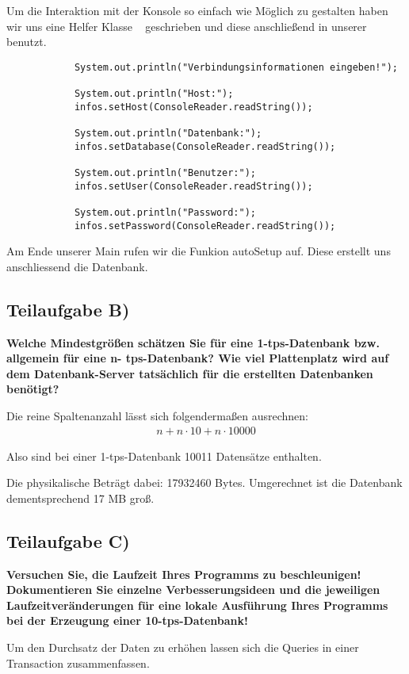 Um die Interaktion mit der Konsole so einfach wie Möglich zu gestalten haben wir
uns eine Helfer Klasse ~ geschrieben und diese anschließend
in unserer  benutzt.

\begin{lstlisting}
			System.out.println("Verbindungsinformationen eingeben!");
			
			System.out.println("Host:");
			infos.setHost(ConsoleReader.readString());

			System.out.println("Datenbank:");
			infos.setDatabase(ConsoleReader.readString());
			
			System.out.println("Benutzer:");
			infos.setUser(ConsoleReader.readString());
			
			System.out.println("Password:");
			infos.setPassword(ConsoleReader.readString());
\end{lstlisting}

Am Ende unserer Main rufen wir die Funkion autoSetup auf. Diese erstellt uns
anschliessend die Datenbank.

\subsection{Teilaufgabe B)}
\textbf{Welche Mindestgrößen schätzen Sie für eine 1-tps-Datenbank bzw. allgemein für eine n-
tps-Datenbank? Wie viel Plattenplatz wird auf dem Datenbank-Server tatsächlich für die
erstellten Datenbanken benötigt?}

Die reine Spaltenanzahl lässt sich folgendermaßen ausrechnen:
\begin{eqnarray}
n + n \cdot 10 + n \cdot 10000
\end{eqnarray}

Also sind bei einer 1-tps-Datenbank 10011 Datensätze enthalten.

Die physikalische Beträgt dabei: 17932460 Bytes. \newline
Umgerechnet ist die Datenbank dementsprechend 17 MB groß.

\subsection{Teilaufgabe C)}
\textbf{Versuchen Sie, die Laufzeit Ihres Programms zu beschleunigen! Dokumentieren Sie
einzelne Verbesserungsideen und die jeweiligen Laufzeitveränderungen für eine lokale
Ausführung Ihres Programms bei der Erzeugung einer 10-tps-Datenbank!}

Um den Durchsatz der Daten zu erhöhen lassen sich die Queries in einer
Transaction zusammenfassen.  

